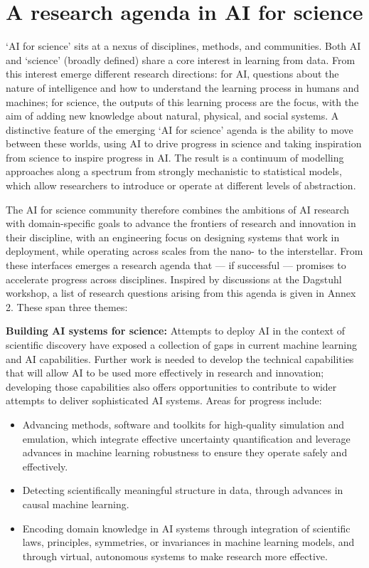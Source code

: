 \section{A research agenda in AI for
science}\label{a-research-agenda-in-ai-for-science}

`AI for science' sits at a nexus of disciplines, methods, and
communities. Both AI and `science' (broadly defined) share a core
interest in learning from data. From this interest emerge different
research directions: for AI, questions about the nature of intelligence
and how to understand the learning process in humans and machines; for
science, the outputs of this learning process are the focus, with the
aim of adding new knowledge about natural, physical, and social systems.
A distinctive feature of the emerging `AI for science' agenda is the
ability to move between these worlds, using AI to drive progress in
science and taking inspiration from science to inspire progress in AI.
The result is a continuum of modelling approaches along a spectrum from
strongly mechanistic to statistical models, which allow researchers to
introduce or operate at different levels of abstraction.

The AI for science community therefore combines the ambitions of AI
research with domain-specific goals to advance the frontiers of research
and innovation in their discipline, with an engineering focus on
designing systems that work in deployment, while operating across scales
from the nano- to the interstellar. From these interfaces emerges a
research agenda that --- if successful --- promises to accelerate progress
across disciplines. Inspired by discussions at the Dagstuhl workshop, a
list of research questions arising from this agenda is given in Annex 2.
These span three themes:

\noindent\textbf{Building AI systems for science:} Attempts to deploy AI
in the context of scientific discovery have exposed a collection of gaps
in current machine learning and AI capabilities. Further work is needed
to develop the technical capabilities that will allow AI to be used more
effectively in research and innovation; developing those capabilities
also offers opportunities to contribute to wider attempts to deliver
sophisticated AI systems. Areas for progress include:

\begin{itemize}
\item
  Advancing methods, software and toolkits for high-quality simulation
  and emulation, which integrate effective uncertainty quantification
  and leverage advances in machine learning robustness to ensure they
  operate safely and effectively.
\item
  Detecting scientifically meaningful structure in data, through
  advances in causal machine learning.
\item
  Encoding domain knowledge in AI systems through integration of
  scientific laws, principles, symmetries, or invariances in machine
  learning models, and through virtual, autonomous systems to make
  research more effective.
\end{itemize}

